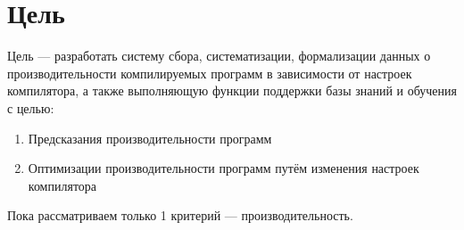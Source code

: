 \section{Цель}
Цель — разработать систему сбора, систематизации, формализации данных о производительности компилируемых программ в зависимости от настроек компилятора, а также выполняющую функции поддержки базы знаний и обучения с целью:
\begin{enumerate}
\item Предсказания производительности программ
\item Оптимизации производительности программ путём изменения настроек компилятора
\end{enumerate}

Пока рассматриваем только 1 критерий — производительность.

